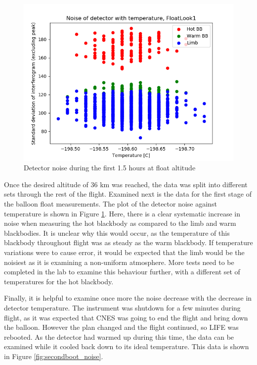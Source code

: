 \begin{figure}
\centering
  \includegraphics[width=0.8\linewidth]{mct_noise_temp_plots/FloatLook1_noisevtemp_invertedx_colours.png}
  \caption{Detector noise during the first 1.5 hours at float altitude}
  \label{fig:float_noise}
\end{figure}

Once the desired altitude of 36 km was reached, the data was split into different sets through the rest of the flight. Examined next is the data for the first stage of the balloon float measurements. The plot of the detector noise against temperature is shown in Figure \ref{fig:float_noise}. Here, there is a clear systematic increase in noise when measuring the hot blackbody as compared to the limb and warm blackbodies. It is unclear why this would occur, as the temperature of this blackbody throughout flight was as steady as the warm blackbody. If temperature variations were to cause error, it would be expected that the limb would be the noisiest as it is examining a non-uniform atmosphere. More tests need to be completed in the lab to examine this behaviour further, with a different set of temperatures for the hot blackbody.

Finally, it is helpful to examine once more the noise decrease with the decrease in detector temperature. The instrument was shutdown for a few minutes during flight, as it was expected that CNES was going to end the flight and bring down the balloon. However the plan changed and the flight continued, so LIFE was rebooted. As the detector had warmed up during this time, the data can be examined while it cooled back down to its ideal temperature. This data is shown in Figure \ref{fig:secondboot_noise}.

